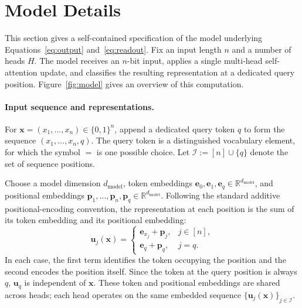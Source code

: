 \documentclass{article}
\theoremstyle{definition}
\theoremstyle{plain}
\newcommand{\bits}{\{0,1\}}
\begin{document}
\section{Model Details}
\label{app:model-details}

This section gives a self-contained specification of the model underlying Equations~\eqref{eq:output} and~\eqref{eq:readout}. Fix an input length $n$ and a number of heads $H$. The model receives an $n$-bit input, applies a single multi-head self-attention update, and classifies the resulting representation at a dedicated query position. Figure~\ref{fig:model} gives an overview of this computation.

\paragraph{Input sequence and representations.}
For $\mathbf{x}=(x_1,\ldots,x_n)\in\bits^n$, append a dedicated query token $q$ to form the sequence $(x_1,\ldots,x_n,q)$. The query token is a distinguished vocabulary element, for which the symbol $=$ is one possible choice. Let $\mathcal{I}:=[n]\cup\{q\}$ denote the set of sequence positions.

Choose a model dimension $d_{\mathrm{model}}$, token embeddings $\mathbf{e}_0,\mathbf{e}_1,\mathbf{e}_q\in\mathbb{R}^{d_{\mathrm{model}}}$, and positional embeddings $\mathbf{p}_1,\ldots,\mathbf{p}_n,\mathbf{p}_q\in\mathbb{R}^{d_{\mathrm{model}}}$. Following the standard additive positional-encoding convention, the representation at each position is the sum of its token embedding and its positional embedding:
\begin{equation}
\mathbf{u}_j(\mathbf{x})=
\begin{cases}
\mathbf{e}_{x_j}+\mathbf{p}_j, & j\in[n],\\
\mathbf{e}_q+\mathbf{p}_q, & j=q.
\end{cases}
\label{eq:app-input-representations}
\end{equation}
In each case, the first term identifies the token occupying the position and the second encodes the position itself. Since the token at the query position is always $q$, $\mathbf{u}_q$ is independent of $\mathbf{x}$. These token and positional embeddings are shared across heads; each head operates on the same embedded sequence $\{\mathbf{u}_j(\mathbf{x})\}_{j\in\mathcal I}$.
\end{document}
